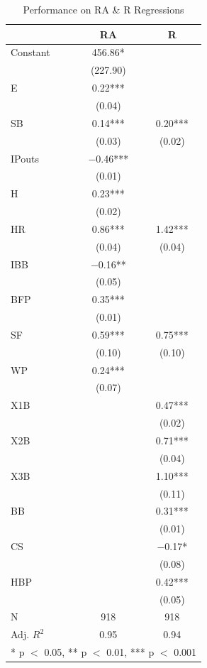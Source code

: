 \documentclass[
  12pt,
  letterpaper,
  DIV=11,
  numbers=noendperiod]{scrartcl}
\begin{document}
\hypertarget{tbl-RSRCSum}{}
\begin{table}
\caption{\label{tbl-RSRCSum}Performance on RA \& R Regressions }\tabularnewline

\centering
\begin{tabular}[t]{lcc}
\toprule
  & RA & R\\
\midrule
Constant & \num{456.86}* & \\
 & (\num{227.90}) & \\
E & \num{0.22}*** & \\
 & (\num{0.04}) & \\
SB & \num{0.14}*** & \num{0.20}***\\
 & (\num{0.03}) & (\num{0.02})\\
IPouts & \num{-0.46}*** & \\
 & (\num{0.01}) \vphantom{1} & \\
H & \num{0.23}*** & \\
 & (\num{0.02}) & \\
HR & \num{0.86}*** & \num{1.42}***\\
 & (\num{0.04}) & (\num{0.04})\\
IBB & \num{-0.16}** & \\
 & (\num{0.05}) & \\
BFP & \num{0.35}*** & \\
 & (\num{0.01}) & \\
SF & \num{0.59}*** & \num{0.75}***\\
 & (\num{0.10}) & (\num{0.10})\\
WP & \num{0.24}*** & \\
 & (\num{0.07}) & \\
X1B &  & \num{0.47}***\\
 &  & (\num{0.02})\\
X2B &  & \num{0.71}***\\
 &  & (\num{0.04})\\
X3B &  & \num{1.10}***\\
 &  & (\num{0.11})\\
BB &  & \num{0.31}***\\
 &  & (\num{0.01})\\
CS &  & \num{-0.17}*\\
 &  & (\num{0.08})\\
HBP &  & \num{0.42}***\\
 &  & (\num{0.05})\\
\midrule
N & \num{918} & \num{918}\\
Adj. $R^2$ & \num{0.95} & \num{0.94}\\
\bottomrule
\multicolumn{3}{l}{\rule{0pt}{1em}* p $<$ 0.05, ** p $<$ 0.01, *** p $<$ 0.001}\\
\end{tabular}
\end{table}
\end{document}
